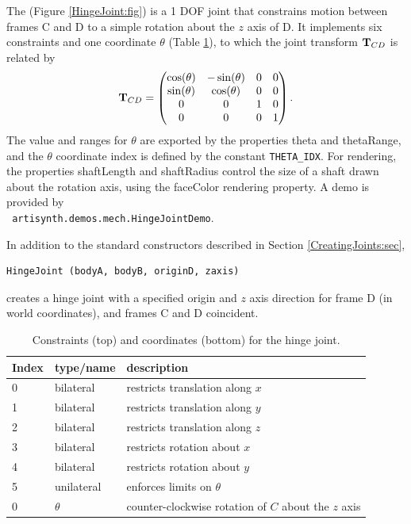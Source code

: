 The  
(Figure \ref{HingeJoint:fig}) is a 1 DOF joint that
constrains motion between frames C and D to a simple rotation about
the $z$ axis of D.  It implements six constraints and one coordinate
$\theta$ (Table \ref{HingeConstraints:tbl}), to which the joint transform
${\bf T}_{CD}$ is related by
%
\begin{equation*}
{\bf T}_{CD} = \left(\begin{matrix}
\cos(\theta) & -\sin(\theta) & 0 & 0 \\
\sin(\theta) &  \cos(\theta) & 0 & 0 \\
0 & 0 & 1 & 0 \\
0 & 0 & 0 & 1 
\end{matrix}\right).
\end{equation*}
%
The value and ranges for $\theta$ are exported by the properties {\sf
theta} and {\sf thetaRange}, and the $\theta$ coordinate index is
defined by the constant {\tt THETA\_IDX}.  For rendering, the
properties {\sf shaftLength} and {\sf shaftRadius} control the size of
a shaft drawn about the rotation axis, using the {\sf faceColor}
rendering property.  A demo is provided by \\ {\tt
artisynth.demos.mech.HingeJointDemo}.

In addition to the standard constructors described in
Section \ref{CreatingJoints:sec},
\begin{lstlisting}[]
  HingeJoint (bodyA, bodyB, originD, zaxis)
\end{lstlisting}
%
creates a hinge joint with a specified origin and $z$ axis direction
for frame D (in world coordinates), and frames C and D coincident.

\begin{table}[h]
\centering
\begin{tabular}{|l|l|l|}
\hline
Index & type/name & description \\
\hline
0 & bilateral & restricts translation along $x$ \\
1 & bilateral & restricts translation along $y$ \\
2 & bilateral & restricts translation along $z$ \\
3 & bilateral & restricts rotation about $x$ \\
4 & bilateral & restricts rotation about $y$ \\
5 & unilateral & enforces limits on $\theta$ \\
\hline
\hline
0 & $\theta$ & counter-clockwise rotation of $C$ about the $z$ axis \\
\hline
\end{tabular}
\caption{Constraints (top) and coordinates (bottom) for the hinge joint.}
\label{HingeConstraints:tbl}
\end{table}

